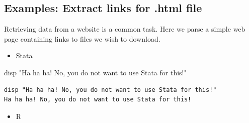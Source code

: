 \documentclass[
]{book}
\newenvironment{Shaded}{\begin{snugshade}}{\end{snugshade}}
\newcommand{\CharTok}[1]{\textcolor[rgb]{0.31,0.60,0.02}{#1}}
\newcommand{\DataTypeTok}[1]{\textcolor[rgb]{0.13,0.29,0.53}{#1}}
\newcommand{\KeywordTok}[1]{\textcolor[rgb]{0.13,0.29,0.53}{\textbf{#1}}}
\newcommand{\NormalTok}[1]{#1}
\newcommand{\OtherTok}[1]{\textcolor[rgb]{0.56,0.35,0.01}{#1}}
\newcommand{\StringTok}[1]{\textcolor[rgb]{0.31,0.60,0.02}{#1}}
\providecommand{\tightlist}{%
  \setlength{\itemsep}{0pt}\setlength{\parskip}{0pt}}
\begin{document}
\hypertarget{examples-extract-links-for-.html-file}{%
\subsection{Examples: Extract links for .html file}\label{examples-extract-links-for-.html-file}}

Retrieving data from a website is a common task. Here we parse a simple web page containing links to files we wish to download.

\begin{itemize}
\tightlist
\item
  Stata
\end{itemize}

\begin{Shaded}
\begin{Highlighting}[]
\NormalTok{disp }\StringTok{"Ha ha ha! No, you do not want to use Stata for this!"}
\end{Highlighting}
\end{Shaded}

\begin{verbatim}
disp "Ha ha ha! No, you do not want to use Stata for this!"
Ha ha ha! No, you do not want to use Stata for this!
\end{verbatim}

\begin{itemize}
\tightlist
\item
  R
\end{itemize}

\begin{Shaded}
\end{Shaded}
\end{document}
